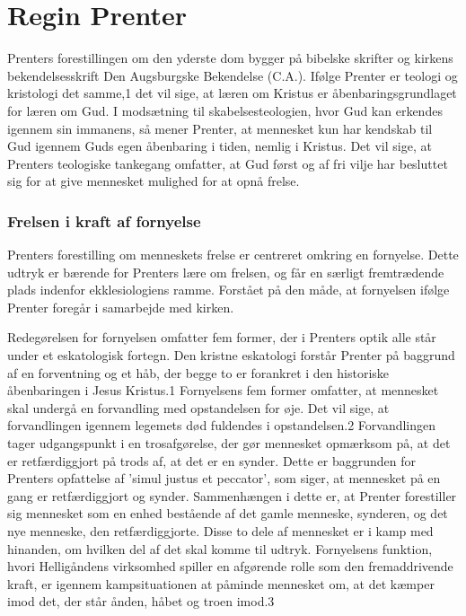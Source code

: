 \section{Regin Prenter}
Prenters forestillingen om den yderste dom bygger på bibelske skrifter og kirkens bekendelsesskrift Den Augsburgske Bekendelse (C.A.). Ifølge Prenter er teologi og kristologi det samme,1 det vil sige, at læren om Kristus er åbenbaringsgrundlaget for læren om Gud. I modsætning til skabelsesteologien, hvor Gud kan erkendes igennem sin immanens, så mener Prenter, at mennesket kun har kendskab til Gud igennem Guds egen åbenbaring i tiden, nemlig i Kristus. Det vil sige, at Prenters teologiske tankegang omfatter, at Gud først og af fri vilje har besluttet sig for at give mennesket mulighed for at opnå frelse.

\subsubsection{Frelsen i kraft af fornyelse}
Prenters forestilling om menneskets frelse er centreret omkring en fornyelse. Dette udtryk er bærende for Prenters lære om frelsen, og får en særligt fremtrædende plads indenfor ekklesiologiens ramme. Forstået på den måde, at fornyelsen ifølge Prenter foregår i samarbejde med kirken.

Redegørelsen for fornyelsen omfatter fem former, der i Prenters optik alle står under et eskatologisk fortegn. Den kristne eskatologi forstår Prenter på baggrund af en forventning og et håb, der begge to er forankret i den historiske åbenbaringen i Jesus Kristus.1 Fornyelsens fem former omfatter, at mennesket skal undergå en forvandling med opstandelsen for øje. Det vil sige, at forvandlingen igennem legemets død fuldendes i opstandelsen.2 Forvandlingen tager udgangspunkt i en trosafgørelse, der gør mennesket opmærksom på, at det er retfærdiggjort på trods af, at det er en synder. Dette er baggrunden for Prenters opfattelse af 'simul justus et peccator', som siger, at mennesket på en gang er retfærdiggjort og synder. Sammenhængen i dette er, at Prenter forestiller sig mennesket som en enhed bestående af det gamle menneske, synderen, og det nye menneske, den retfærdiggjorte. Disse to dele af mennesket er i kamp med hinanden, om hvilken del af det skal komme til udtryk. Fornyelsens funktion, hvori Helligåndens virksomhed spiller en afgørende rolle som den fremaddrivende kraft, er igennem kampsituationen at påminde mennesket om, at det kæmper imod det, der står ånden, håbet og troen imod.3

